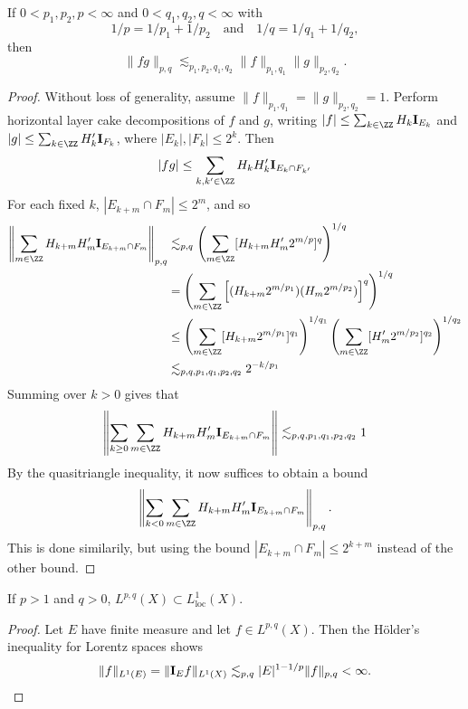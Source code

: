 \begin{theorem}
    If $0 < p_1,p_2,p < \infty$ and $0 < q_1,q_2,q < \infty$ with
    \[ 1/p = 1/p_1 + 1/p_2 \quad \text{and} \quad 1/q = 1/q_1 + 1/q_2, \]
    then
    \[ \| f g \|_{p,q} \lesssim_{p_1,p_2,q_1,q_2} \| f \|_{p_1,q_1} \| g \|_{p_2,q_2}. \]
\end{theorem}
\begin{proof}
    Without loss of generality, assume $\| f \|_{p_1,q_1} = \| g \|_{p_2, q_2} = 1$. Perform horizontal layer cake decompositions of $f$ and $g$, writing $|f| \leq \sum_{k \in \ZZ} H_k \mathbf{I}_{E_k}$ and $|g| \leq \sum_{k \in \ZZ} H_k' \mathbf{I}_{F_k}$, where $|E_k|, |F_k| \leq 2^k$. Then
    \[ |fg| \leq \sum_{k,k' \in \ZZ} H_k H_k' \mathbf{I}_{E_k \cap F_{k'}} \]
    For each fixed $k$, $|E_{k + m} \cap F_m| \leq 2^m$, and so
    \begin{align*}
        \left\| \sum_{m \in \ZZ} H_{k + m} H_m' \mathbf{I}_{E_{k+m} \cap F_m} \right\|_{p,q} &\lesssim_{p,q} \left( \sum_{m \in \ZZ} [H_{k+m} H_m' 2^{m/p}]^q \right)^{1/q}\\
        &= \left( \sum_{m \in \ZZ} \left[ (H_{k+m} 2^{m/p_1}) (H_m 2^{m/p_2}) \right]^q \right)^{1/q}\\
        &\leq \left( \sum_{m \in \ZZ} [H_{k+m} 2^{m/p_1} ]^{q_1} \right)^{1/q_1} \left( \sum_{m \in \ZZ} [H_m' 2^{m/p_2}]^{q_2} \right)^{1/q_2}\\
        &\lesssim_{p,q,p_1,q_1,p_2,q_2} 2^{-k/p_1}\\
    \end{align*}
    Summing over $k > 0$ gives that
    \[ \left\| \sum_{k \geq 0} \sum_{m \in \ZZ} H_{k+m} H_m' \mathbf{I}_{E_{k+m} \cap F_m} \right\| \lesssim_{p,q,p_1,q_1,p_2,q_2} 1 \]
    By the quasitriangle inequality, it now suffices to obtain a bound
    \[ \left\| \sum_{k < 0} \sum_{m \in \ZZ} H_{k+m} H_m' \mathbf{I}_{E_{k+m} \cap F_m} \right\|_{p,q}. \]
    This is done similarily, but using the bound $|E_{k+m} \cap F_m| \leq 2^{k+m}$ instead of the other bound.
\end{proof}

\begin{corollary}
    If $p > 1$ and $q > 0$, $L^{p,q}(X) \subset L^1_{\text{loc}}(X)$.
\end{corollary}
\begin{proof}
    Let $E$ have finite measure and let $f \in L^{p,q}(X)$. Then the H\"{o}lder's inequality for Lorentz spaces shows
    \[ \| f \|_{L^1(E)} = \| \mathbf{I}_E f \|_{L^1(X)} \lesssim_{p,q} |E|^{1 - 1/p} \| f \|_{p,q} < \infty. \qedhere \]
\end{proof}

